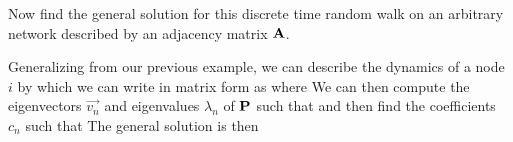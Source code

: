\subquestion 
Now find the general solution for this discrete time random walk on an arbitrary network described by an adjacency matrix $\bf A$. 

\solution
Generalizing from our previous example, we can describe the dynamics of a node $i$ by
which we can write in matrix form as 
where 
We can then compute the eigenvectors $\vec{v_n}$ and eigenvalues $\lambda_n$ of $\bf P$ such that 
and then find the coefficients $c_n$ such that 
The general solution is then 
